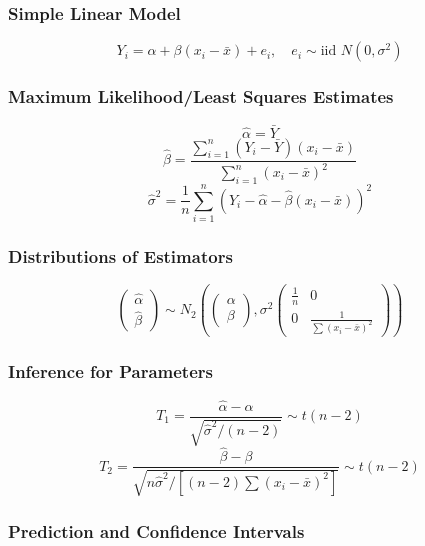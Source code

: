 \subsubsection{Simple Linear Model}
\[
Y_i = \alpha + \beta(x_i - \bar{x}) + e_i, \quad e_i \sim \text{iid } N(0, \sigma^2)
\]

\subsubsection{Maximum Likelihood/Least Squares Estimates}

\begin{theorem}
\[
\hat{\alpha} = \bar{Y}
\]
\[
\hat{\beta} = \frac{\sum_{i=1}^n (Y_i - \bar{Y})(x_i - \bar{x})}{\sum_{i=1}^n (x_i - \bar{x})^2}
\]
\[
\hat{\sigma}^2 = \frac{1}{n}\sum_{i=1}^n (Y_i - \hat{\alpha} - \hat{\beta}(x_i - \bar{x}))^2
\]
\end{theorem}
\subsubsection{Distributions of Estimators}
\[
\begin{pmatrix} \hat{\alpha} \\ \hat{\beta} \end{pmatrix} \sim N_2\left(\begin{pmatrix} \alpha \\ \beta \end{pmatrix}, \sigma^2 \begin{pmatrix} \frac{1}{n} & 0 \\ 0 & \frac{1}{\sum(x_i-\bar{x})^2} \end{pmatrix}\right)
\]

\subsubsection{Inference for Parameters}

\begin{theorem}
\[
T_1 = \frac{\hat{\alpha} - \alpha}{\sqrt{\hat{\sigma}^2/(n-2)}} \sim t(n-2)
\]
\[
T_2 = \frac{\hat{\beta} - \beta}{\sqrt{n\hat{\sigma}^2/[(n-2)\sum(x_i-\bar{x})^2]}} \sim t(n-2)
\]
\end{theorem}
\subsubsection{Prediction and Confidence Intervals}

